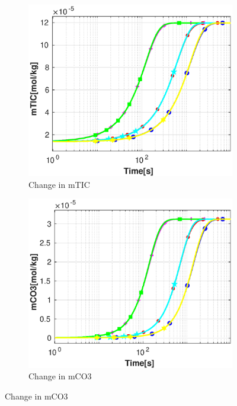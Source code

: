 \begin{figure}
    \hfill
    \begin{subfigure}{.5\linewidth}
            \centering
        \includegraphics[width=\textwidth]{PICTURES/dvm_pH8_mTIC.eps}
        \caption{\small Change in mTIC}
        \label{fig:dvmpH8mTIC}
    \end{subfigure}%
    \hfill
    \begin{subfigure}{.5\linewidth}
            \centering
        \includegraphics[width=\textwidth]{PICTURES/dvm_pH8_mCO3.eps}
        \caption{\small Change in mCO3}
        \label{fig:dvmpH8mCO3}

\end{subfigure}
\end{figure}
